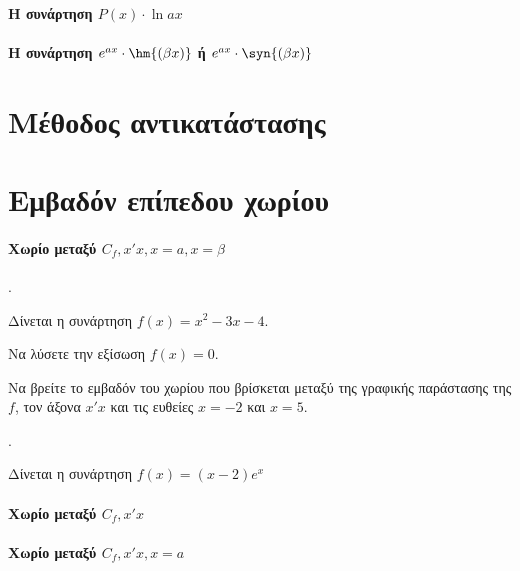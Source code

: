 \documentclass[11pt,a4paper,twocolumn]{article}
\newcounter{askhsh}
\newcommand{\askhsh}{\large\theaskhsh.\ \addtocounter{askhsh}{1}}
\begin{document}
\paragraph{Η συνάρτηση $P(x)\cdot \ln{ax}$}
\paragraph{Η συνάρτηση $e^{ax}\cdot \hm{(\beta x)}$ ή $e^{ax}\cdot \syn{(\beta x)}$}
\section{Μέθοδος αντικατάστασης}
\section{Εμβαδόν επίπεδου χωρίου}
\paragraph{Χωρίο μεταξύ $C_f,x'x,x=a,x=\beta$}
\askhsh Δίνεται η συνάρτηση $f(x)=x^2-3x-4$.
\begin{alist}
\item Να λύσετε την εξίσωση $f(x)=0$.
\item Να βρείτε το εμβαδόν του χωρίου που βρίσκεται μεταξύ της γραφικής παράστασης της $f$, τον άξονα $x'x$ και τις ευθείες $x=-2$ και $x=5$.
\end{alist}
\askhsh Δίνεται η συνάρτηση $f(x)=(x-2)e^x$
\paragraph{Χωρίο μεταξύ $C_f,x'x$}
\paragraph{Χωρίο μεταξύ $C_f,x'x,x=a$}
\end{document}
